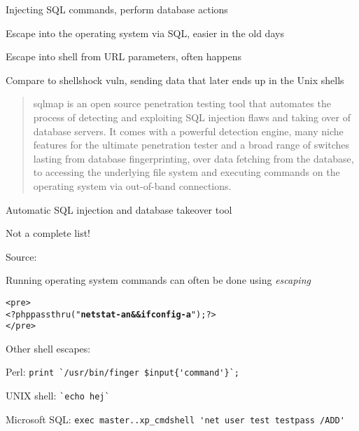 \documentclass[Screen16to9,17pt]{foils}
\begin{document}
\begin{list2}
\item Injecting SQL commands, perform database actions
\item Escape into the operating system via SQL, easier in the old days
\item Escape into shell from URL parameters, often happens
\item Compare to shellshock vuln, sending data that later ends up in the Unix shells
\end{list2}



\begin{quote}\small
sqlmap is an open source penetration testing tool that automates the process of detecting and exploiting SQL injection flaws and taking over of database servers. It comes with a powerful detection engine, many niche features for the ultimate penetration tester and a broad range of switches lasting from database fingerprinting, over data fetching from the database, to accessing the underlying file system and executing commands on the operating system via out-of-band connections.

\end{quote}

\begin{list1}
\item Automatic SQL injection and database takeover tool
\end{list1}




Not a complete list!

Source: 


Running operating system commands can often be done using \emph{escaping}
\begin{alltt}
<pre>
<?php passthru("{\bfseries netstat -an && ifconfig -a}"); ?>
</pre>
\end{alltt}
\begin{list1}
\item Other shell escapes:
\begin{list2}
\item Perl: \verb+print `/usr/bin/finger $input{'command'}`;+
\item UNIX shell: \verb+`echo hej`+
\item Microsoft SQL: \verb+exec master..xp_cmdshell 'net user test testpass /ADD'+
\end{list2}
\end{list1}
\end{document}
